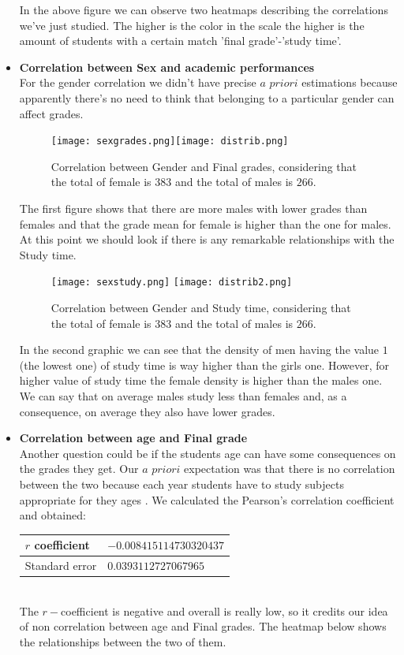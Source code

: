 \documentclass[a4paper, 11pt]{report}
\theoremstyle{definition}
\numberwithin{equation}{section}		%
\numberwithin{figure}{section}			%
\numberwithin{table}{section}				%
\begin{document}
\begin{itemize}
In the above figure we can observe two heatmaps describing the correlations we've just studied. The higher is the color in the scale the higher is the amount of students with a certain match 'final grade'-'study time'.


\item \textbf{Correlation between Sex and academic performances}
\\For the gender correlation we didn't have precise $a$ $priori$ estimations because apparently there's no need to think that belonging to a particular gender can affect grades.

\begin{figure}[h]\centering
\texttt{[image: sexgrades.png]}\quad\texttt{[image: distrib.png]}
\caption{Correlation between Gender and Final grades, considering that the total of female is $383$ and the total of males is $266$.}
\end{figure}

The first figure shows that there are more males with lower grades than females and that the grade mean for female is higher than the one for males. At this point we should look if there is any remarkable relationships with the Study time.

\begin{figure}[h]\centering
\texttt{[image: sexstudy.png]}
\texttt{[image: distrib2.png]}
\caption{Correlation between Gender and Study time, considering that the total of female is $383$ and the total of males is $266$.}
\end{figure}

In the second graphic we can see that the density of men having the value $1$ (the lowest one) of study time is way higher than the girls one. However, for higher value of study time the female density is higher than the males one. We can say that on average males study less than females and, as a consequence, on average they also have lower grades.



\item \textbf{Correlation between age and Final grade}
\\Another question could be if the students age can have some consequences on the grades they get. Our $a$ $priori$ expectation was that there is no correlation between the two because each year students have to study subjects appropriate for they ages . We calculated the Pearson's correlation coefficient and obtained:
\begin{center}
\begin{tabular}{|p{3cm}|p{4cm}|}
$r$ coefficient & $-0.008415114730320437$ \\
\hline
Standard error & $0.0393112727067965$ \\
\hline
\end{tabular}
\end{center}
\\The $r-$coefficient is negative and overall is really low, so it credits our idea of non correlation between age and Final grades. The heatmap below shows the relationships between the two of them.


\end{itemize}
\end{document}
